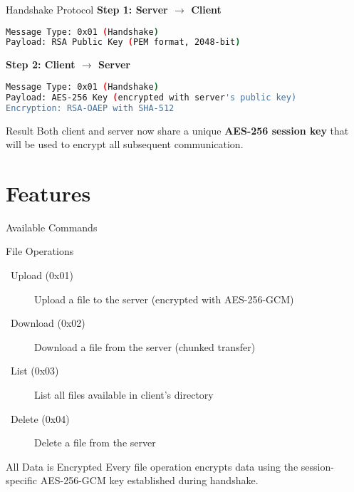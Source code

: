 \documentclass[aspectratio=169]{beamer}
\begin{document}
\begin{frame}[fragile]{Handshake Protocol}
\textbf{Step 1: Server $\rightarrow$ Client}
\begin{lstlisting}[language=bash, basicstyle=\ttfamily\footnotesize]
Message Type: 0x01 (Handshake)
Payload: RSA Public Key (PEM format, 2048-bit)
\end{lstlisting}

\vspace{0.3cm}

\textbf{Step 2: Client $\rightarrow$ Server}
\begin{lstlisting}[language=bash, basicstyle=\ttfamily\footnotesize]
Message Type: 0x01 (Handshake)
Payload: AES-256 Key (encrypted with server's public key)
Encryption: RSA-OAEP with SHA-512
\end{lstlisting}

\vspace{0.3cm}

\begin{block}{Result}
Both client and server now share a unique \textbf{AES-256 session key} that will be used to encrypt all subsequent communication.
\end{block}
\end{frame}

\section{Features}

\begin{frame}{Available Commands}
\begin{block}{File Operations}
\begin{description}
    \item[\faUpload~Upload (0x01)] Upload a file to the server (encrypted with AES-256-GCM)
    \item[\faDownload~Download (0x02)] Download a file from the server (chunked transfer)
    \item[\faList~List (0x03)] List all files available in client's directory
    \item[\faTrash~Delete (0x04)] Delete a file from the server
\end{description}
\end{block}

\vspace{0.5cm}

\begin{alertblock}{All Data is Encrypted}
Every file operation encrypts data using the session-specific AES-256-GCM key established during handshake.
\end{alertblock}
\end{frame}
\end{document}
